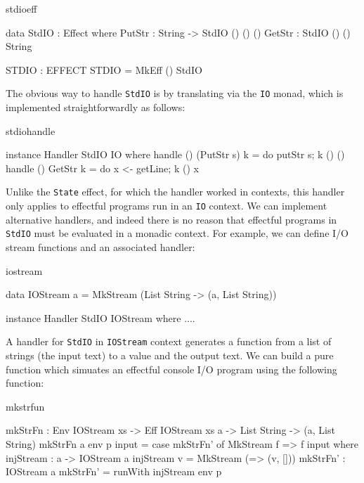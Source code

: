 \begin{SaveVerbatim}{stdioeff}

data StdIO : Effect where
     PutStr : String -> StdIO () () ()
     GetStr : StdIO () () String

STDIO : EFFECT
STDIO = MkEff () StdIO

\end{SaveVerbatim}

\noindent
The obvious way to handle \texttt{StdIO} is by translating via the \texttt{IO}
monad, which is implemented straightforwardly as follows:

\begin{SaveVerbatim}{stdiohandle}

instance Handler StdIO IO where
    handle () (PutStr s) k = do putStr s; k () ()
    handle () GetStr     k = do x <- getLine; k () x 

\end{SaveVerbatim}

\noindent
Unlike the \texttt{State} effect, for which the handler worked in 
contexts, this handler only applies to effectful programs run in an \texttt{IO}
context. We can implement alternative handlers, and indeed there is no
reason that effectful programs in \texttt{StdIO} must be evaluated in a monadic
context. For example, we can define I/O stream functions and an associated
handler:

\begin{SaveVerbatim}{iostream}

data IOStream a 
   = MkStream (List String -> (a, List String))

instance Handler StdIO IOStream where
    ....

\end{SaveVerbatim}

\noindent
A handler for \texttt{StdIO} in \texttt{IOStream} context generates a function
from a list of strings (the input text) to a value and the output text. We
can build a pure function which simuates an effectful console I/O program
using the following function:

\begin{SaveVerbatim}{mkstrfun}

mkStrFn : Env IOStream xs -> Eff IOStream xs a -> 
          List String -> (a, List String)
mkStrFn {a} env p input = case mkStrFn' of
                               MkStream f => f input
  where injStream : a -> IOStream a
        injStream v = MkStream (\x => (v, []))
        mkStrFn' : IOStream a
        mkStrFn' = runWith injStream env p

\end{SaveVerbatim}

